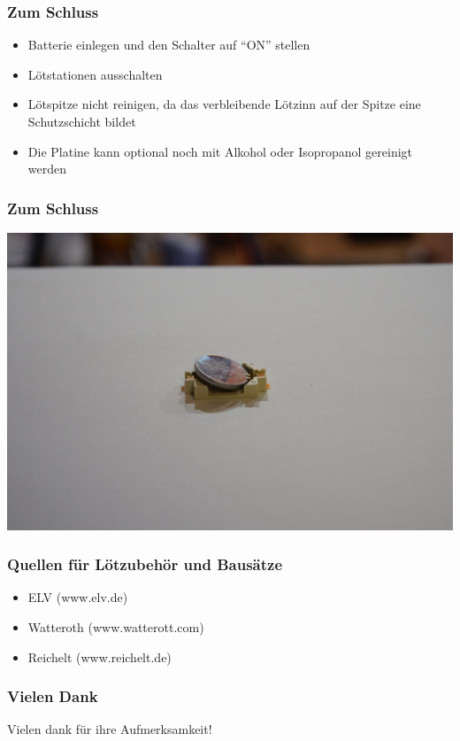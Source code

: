 \documentclass[10pt]{beamer}
\begin{document}
	\begin{frame}
	\frametitle{Zum Schluss}
	\begin{itemize} 
		\item{Batterie einlegen und den Schalter auf ``ON'' stellen}
		\item{Lötstationen ausschalten}
		\item{Lötspitze nicht reinigen, da das verbleibende Lötzinn auf der Spitze eine Schutzschicht bildet}
		\item{Die Platine kann optional noch mit Alkohol oder Isopropanol gereinigt werden}
	\end{itemize}
	\end{frame}

	\begin{frame}
		\frametitle{Zum Schluss}
		\includegraphics[width=\linewidth]{images/badge18/battHolderWithBattery.JPG}
	\end{frame}

	\begin{frame}
		\frametitle{Quellen für Lötzubehör und Bausätze}
		\begin{itemize}
			\item{ELV (www.elv.de)}
			\item{Watteroth (www.watterott.com)}
			\item{Reichelt (www.reichelt.de)}
		\end{itemize}
	\end{frame}

	\begin{frame}
	\frametitle{Vielen Dank}
	\centering
	Vielen dank für ihre Aufmerksamkeit!
	\end{frame}
    
\end{document}
